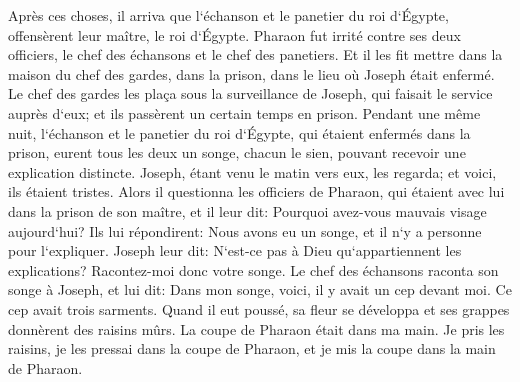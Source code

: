 \verse Après ces choses, il arriva que l`échanson et le panetier du roi d`Égypte, offensèrent leur maître, le roi d`Égypte. 
\verse Pharaon fut irrité contre ses deux officiers, le chef des échansons et le chef des panetiers. 
\verse Et il les fit mettre dans la maison du chef des gardes, dans la prison, dans le lieu où Joseph était enfermé. 
\verse Le chef des gardes les plaça sous la surveillance de Joseph, qui faisait le service auprès d`eux; et ils passèrent un certain temps en prison. 
\verse Pendant une même nuit, l`échanson et le panetier du roi d`Égypte, qui étaient enfermés dans la prison, eurent tous les deux un songe, chacun le sien, pouvant recevoir une explication distincte. 
\verse Joseph, étant venu le matin vers eux, les regarda; et voici, ils étaient tristes. 
\verse Alors il questionna les officiers de Pharaon, qui étaient avec lui dans la prison de son maître, et il leur dit: Pourquoi avez-vous mauvais visage aujourd`hui? 
\verse Ils lui répondirent: Nous avons eu un songe, et il n`y a personne pour l`expliquer. Joseph leur dit: N`est-ce pas à Dieu qu`appartiennent les explications? Racontez-moi donc votre songe. 
\verse Le chef des échansons raconta son songe à Joseph, et lui dit: Dans mon songe, voici, il y avait un cep devant moi. 
\verse Ce cep avait trois sarments. Quand il eut poussé, sa fleur se développa et ses grappes donnèrent des raisins mûrs. 
\verse La coupe de Pharaon était dans ma main. Je pris les raisins, je les pressai dans la coupe de Pharaon, et je mis la coupe dans la main de Pharaon. 
